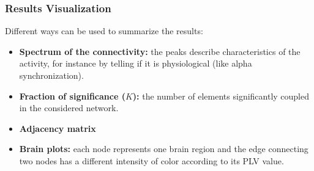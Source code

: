 \subsubsection{Results Visualization}
Different ways can be used to summarize the results:
\begin{itemize}
    \item \textbf{Spectrum of the connectivity:} the peaks describe characteristics of the activity,
          for instance by telling if it is physiological (like alpha synchronization).
    \item \textbf{Fraction of significance (\(K\)):} the number of elements significantly coupled in the
          considered network.
    \item \textbf{Adjacency matrix}
    \item \textbf{Brain plots:} each node represents one brain region and the edge connecting two nodes
          has a different intensity of color according to its PLV value.
\end{itemize}
\begin{figure}[H]
    \centering
    \subfigure[]{\texttt{[image: 14\_4]}}
    \subfigure[]{\texttt{[image: 14\_5]}}
\end{figure}
\begin{figure}[H]
    \centering
    \subfigure[]{\texttt{[image: 14\_6]}}
    \subfigure[]{\texttt{[image: 14\_7]}}
\end{figure}

